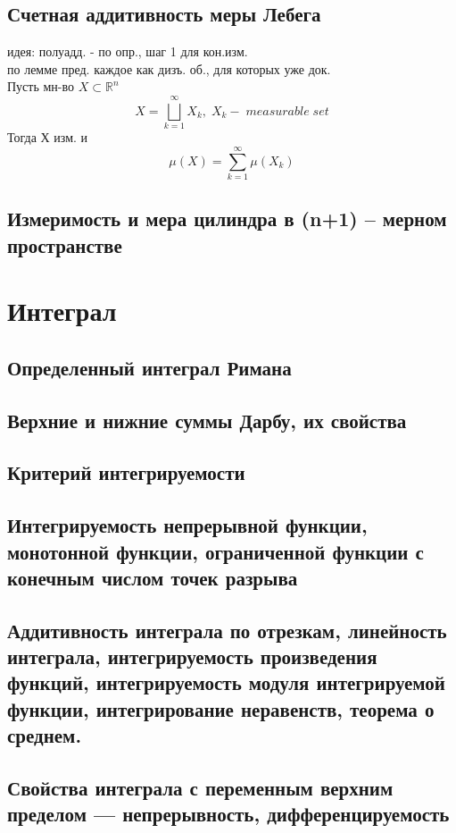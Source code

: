 \documentclass{article}
\begin{document}
\subsection{Счетная аддитивность меры Лебега}
идея: полуадд. - по опр., шаг 1 для кон.изм.\\
по лемме пред. каждое как дизъ. об., для которых уже док. \\
Пусть мн-во $X \subset \mathbb R^n$
\begin{equation*}
    X = \bigsqcup_{k=1}^{\infty} X_k, \; X_k - \; measurable \; set
\end{equation*}
Тогда Х изм. и
\begin{equation*}
    \mu (X) = \sum_{k=1}^\infty \mu ( X_k )
\end{equation*}
\subsection{Измеримость и мера цилиндра в (n+1) – мерном пространстве}


\section{Интеграл}
\subsection{Определенный интеграл Римана}
\subsection{Верхние и нижние суммы Дарбу, их свойства}
\subsection{Критерий интегрируемости}
\subsection{Интегрируемость непрерывной функции, монотонной функции, ограниченной функции с конечным числом точек разрыва}
\subsection{Аддитивность интеграла по отрезкам, линейность интеграла, интегрируемость произведения функций, интегрируемость модуля интегрируемой функции, интегрирование неравенств, теорема о среднем.}
\subsection{Свойства интеграла с переменным верхним пределом — непрерывность, дифференцируемость}
\end{document}
